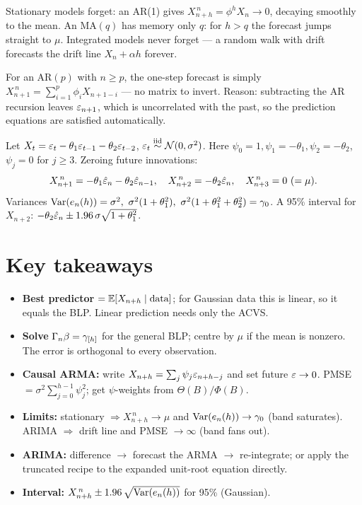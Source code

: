 \documentclass[11pt]{article}
\begin{document}
\begin{intu}
Stationary models forget: an AR(1) gives $X^{\,n}_{n+h}=\phi^h X_n\to0$, decaying smoothly to the
mean. An MA$(q)$ has memory only $q$: for $h>q$ the forecast jumps straight to $\mu$. Integrated
models never forget --- a random walk with drift forecasts the drift line $X_n+\alpha h$ forever.
\end{intu}

\begin{intu}[AR$(p)$ shortcut]
For an AR$(p)$ with $n\ge p$, the one-step forecast is simply
$X^{\,n}_{n+1}=\sum_{i=1}^p\phi_i X_{n+1-i}$ --- no matrix to invert. Reason: subtracting the AR
recursion leaves $\varepsilon_{n+1}$, which is uncorrelated with the past, so the prediction equations are
satisfied automatically.
\end{intu}

\begin{exmpl}
Let $X_t=\varepsilon_t-\theta_1\varepsilon_{t-1}-\theta_2\varepsilon_{t-2}$, $\varepsilon_t\overset{\text{iid}}{\sim}\mathcal N(0,\sigma^2)$. Here
$\psi_0=1,\psi_1=-\theta_1,\psi_2=-\theta_2$, $\psi_j=0$ for $j\ge3$. Zeroing future innovations:
\[
X^{\,n}_{n+1}=-\theta_1\hat{\varepsilon}_n-\theta_2\hat{\varepsilon}_{n-1},\quad
X^{\,n}_{n+2}=-\theta_2\hat{\varepsilon}_n,\quad
X^{\,n}_{n+3}=0\ (=\mu).
\]
Variances $\Var(e_n(h))=\sigma^2,\ \sigma^2(1+\theta_1^2),\ \sigma^2(1+\theta_1^2+\theta_2^2)=\acvs_0$.
A 95\% interval for $X_{n+2}$: $-\theta_2\hat{\varepsilon}_n\pm1.96\,\sigma\sqrt{1+\theta_1^2}$.
\end{exmpl}

\section*{Key takeaways}

\begin{retenir}
\begin{itemize}
  \item \textbf{Best predictor} $=\mathbb{E}[X_{n+h}\mid\text{data}]$; for Gaussian data this is linear, so
        it equals the BLP. Linear prediction needs only the ACVS.
  \item \textbf{Solve} $\Gamma_n\beta=\gamma_{[h]}$ for the general BLP; centre by $\mu$ if the mean
        is nonzero. The error is orthogonal to every observation.
  \item \textbf{Causal ARMA:} write $X_{n+h}=\sum_j\psi_j\varepsilon_{n+h-j}$ and set future
        $\varepsilon\to0$. PMSE $=\sigma^2\sum_{j=0}^{h-1}\psi_j^2$; get $\psi$-weights from
        $\Theta(B)/\Phi(B)$.
  \item \textbf{Limits:} stationary $\Rightarrow X^{\,n}_{n+h}\to\mu$ and
        $\operatorname{Var}(e_n(h))\to\gamma_0$ (band saturates). ARIMA $\Rightarrow$ drift line and PMSE
        $\to\infty$ (band fans out).
  \item \textbf{ARIMA:} difference $\to$ forecast the ARMA $\to$ re-integrate; or apply the
        truncated recipe to the expanded unit-root equation directly.
  \item \textbf{Interval:} $X^{\,n}_{n+h}\pm 1.96\,\sqrt{\operatorname{Var}(e_n(h))}$ for 95\% (Gaussian).
\end{itemize}
\end{retenir}
\end{document}
